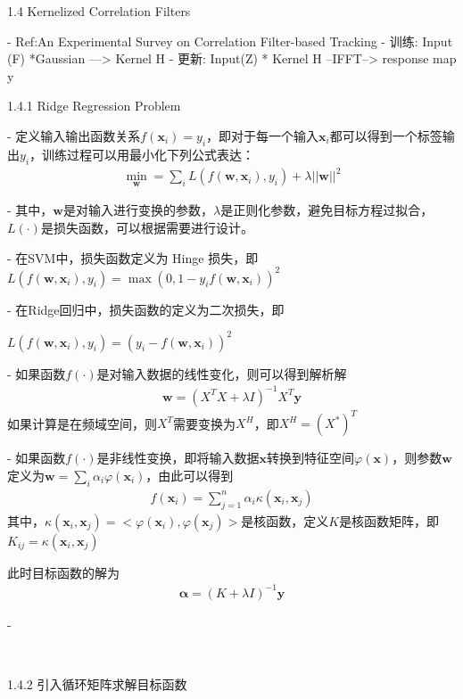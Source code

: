 1.4 Kernelized Correlation Filters

- Ref:An Experimental Survey on Correlation Filter-based Tracking
- 训练:  Input (F) *Gaussian ---> Kernel H
- 更新:  Input(Z) * Kernel H --IFFT--> response map y

1.4.1 Ridge Regression Problem

- 定义输入输出函数关系$f(\mathbf{x}_i)=y_i$，即对于每一个输入$\mathbf{x}_i$都可以得到一个标签输出$y_i$，训练过程可以用最小化下列公式表达：
\begin{align}
\min_\mathbf{w}=\sum_{i}L(f(\mathbf{w},\mathbf{x}_i),y_i)+\lambda||\mathbf{w}||^2
\end{align}

- 其中，$\mathbf{w}$是对输入进行变换的参数，$\lambda$是正则化参数，避免目标方程过拟合，$L(\cdot)$是损失函数，可以根据需要进行设计。

- 在SVM中，损失函数定义为 Hinge 损失，即$L(f(\mathbf{w},\mathbf{x}_i),y_i)=\max (0,1-y_i f(\mathbf{w},\mathbf{x}_i))^2$

- 在Ridge回归中，损失函数的定义为二次损失，即

$L(f(\mathbf{w},\mathbf{x}_i),y_i)=(y_i-f(\mathbf{w},\mathbf{x}_i))^2$

- 如果函数$f(\cdot)$是对输入数据的线性变化，则可以得到解析解
\begin{align}
\mathbf{w}=(X^TX+\lambda I)^{-1}X^T\mathbf{y}
\end{align}
如果计算是在频域空间，则$X^T$需要变换为$X^H$，即$X^H=(X^*)^T$

- 如果函数$f(\cdot)$是非线性变换，即将输入数据$\mathbf{x}$转换到特征空间$\varphi(\mathbf{x})$，则参数$\mathbf{w}$定义为$\mathbf{w}=\sum_i\alpha_i \varphi(\mathbf{x}_i)$，由此可以得到
\begin{align}
f(\mathbf{x}_i)=\sum_{j=1}^n\alpha_i \kappa(\mathbf{x}_i,\mathbf{x}_j)
\end{align}
其中，$ \kappa(\mathbf{x}_i,\mathbf{x}_j)=<\varphi(\mathbf{x}_i), \varphi(\mathbf{x}_j)>$是核函数，定义$K$是核函数矩阵，即$K_{ij}=\kappa(\mathbf{x}_i,\mathbf{x}_j)$

此时目标函数的解为
\begin{align}
\mathbf{\alpha}=(K+\lambda I)^{-1}\mathbf{y}
\end{align}

- ​

​

1.4.2 引入循环矩阵求解目标函数



